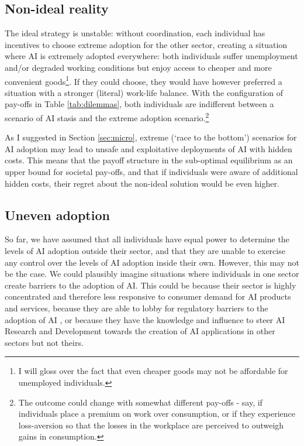 \documentclass[11pt]{article}
\begin{document}
\subsection{Non-ideal reality}
\label{subsec:ideal_auto}
The ideal strategy is unstable: without coordination, each individual has incentives to choose extreme adoption for the other sector, creating a situation where AI is extremely adopted everywhere: both individuals suffer unemployment and/or degraded working conditions but enjoy access to cheaper and more convenient goods\footnote{I will gloss over the fact that even cheaper goods may not be affordable for unemployed individuals.}. If they could choose, they would have however preferred a situation with a stronger (literal) work-life balance. With the configuration of pay-offs in Table \ref{tab:dilemmas}, both individuals are indifferent between a scenario of AI stasis and the extreme adoption scenario.\footnote{The outcome could change with somewhat different pay-offs - say, if individuals place a premium on work over consumption, or if they experience loss-aversion so that the losses in the workplace are perceived to outweigh gains in consumption.}

As I suggested in Section \ref{sec:micro}, extreme (`race to the bottom') scenarios for AI adoption may lead to unsafe and exploitative deployments of AI with hidden costs. This means that the payoff structure in the sub-optimal equilibrium as an upper bound for societal pay-offs, and that if individuals were aware of additional hidden costs, their regret about the non-ideal solution would be even higher.

\subsection{Uneven adoption}
\label{subsec:manipulation}
So far, we have assumed that all individuals have equal power to determine the levels of AI adoption outside their sector, and that they are unable to exercise any control over the levels of AI adoption inside their own. However, this may not be the case. We could plausibly imagine situations where individuals in one sector create barriers to the adoption of AI. This could be because their sector is highly concentrated and therefore less responsive to consumer demand for AI products and services, because they are able to lobby for regulatory barriers to the adoption of AI , or because they have the knowledge and influence to steer AI Research and Development towards the creation of AI applications in other sectors but not theirs. 
\end{document}
